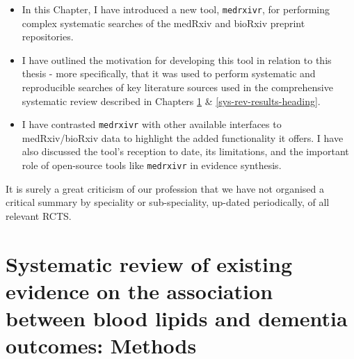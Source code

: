 \documentclass[a4paper, twoside]{templates/ociamthesis}
\begin{document}
\begin{itemize}
\item
  In this Chapter, I have introduced a new tool, \texttt{medrxivr}, for performing complex systematic searches of the medRxiv and bioRxiv preprint repositories.
\item
  I have outlined the motivation for developing this tool in relation to this thesis - more specifically, that it was used to perform systematic and reproducible searches of key literature sources used in the comprehensive systematic review described in Chapters \ref{sys-rev-methods-heading} \& \ref{sys-rev-results-heading}.
\item
  I have contrasted \texttt{medrxivr} with other available interfaces to medRxiv/bioRxiv data to highlight the added functionality it offers. I have also discussed the tool's reception to date, its limitations, and the important role of open-source tools like \texttt{medrxivr} in evidence synthesis.
\end{itemize}

\begin{savequote}
It is surely a great criticism of our profession that we have not
organised a critical summary by speciality or sub-speciality, up-dated
periodically, of all relevant RCTS.
\end{savequote}



\hypertarget{sys-rev-methods-heading}{%
\chapter{Systematic review of existing evidence on the association between blood lipids and dementia outcomes: Methods}\label{sys-rev-methods-heading}}

~

\minitoc 
\end{document}

